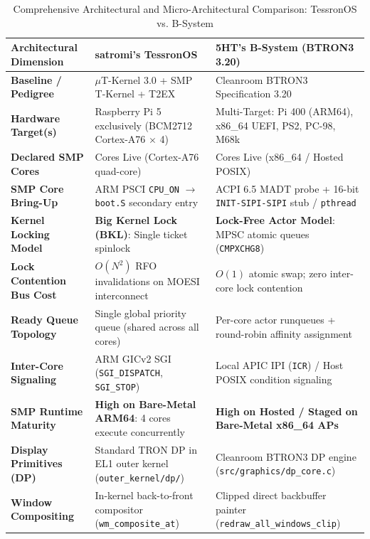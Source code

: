 \documentclass[10pt,journal,compsoc,twocolumn]{article}
\begin{document}
\begin{table}[t]
\centering
\caption{Comprehensive Architectural and Micro-Architectural Comparison: TessronOS vs. B-System}
\label{tab:comprehensive_comparison}
\scriptsize
\setlength{\tabcolsep}{5pt}
\renewcommand{\arraystretch}{1.12}
\begin{tabularx}{\textwidth}{@{} >{\raggedright\arraybackslash}p{3.8cm} >{\raggedright\arraybackslash}X >{\raggedright\arraybackslash}X @{}}
\toprule
\textbf{Architectural Dimension} & \textbf{satromi's TessronOS} & \textbf{5HT's B-System (BTRON3 3.20)} \\
\midrule
\textbf{Baseline / Pedigree} & $\mu$T-Kernel 3.0 + SMP T-Kernel + T2EX & Cleanroom BTRON3 Specification 3.20 \\
\textbf{Hardware Target(s)} & Raspberry Pi 5 exclusively (BCM2712 Cortex-A76 $\times$ 4) & Multi-Target: Pi 400 (ARM64), x86\_64 UEFI, PS2, PC-98, M68k \\
\textbf{Declared SMP Cores} & 4 Cores Live (Cortex-A76 quad-core) & 4 Cores Live (x86\_64 / Hosted POSIX) \\
\textbf{SMP Core Bring-Up} & ARM PSCI \texttt{CPU\_ON} $\to$ \texttt{boot.S} secondary entry & ACPI 6.5 MADT probe + 16-bit \texttt{INIT-SIPI-SIPI} stub / \texttt{pthread} \\
\textbf{Kernel Locking Model} & \textbf{Big Kernel Lock (BKL)}: Single ticket spinlock & \textbf{Lock-Free Actor Model}: MPSC atomic queues (\texttt{CMPXCHG8}) \\
\textbf{Lock Contention Bus Cost} & $O(N^2)$ RFO invalidations on MOESI interconnect & $O(1)$ atomic swap; zero inter-core lock contention \\
\textbf{Ready Queue Topology} & Single global priority queue (shared across all cores) & Per-core actor runqueues + round-robin affinity assignment \\
\textbf{Inter-Core Signaling} & ARM GICv2 SGI (\texttt{SGI\_DISPATCH}, \texttt{SGI\_STOP}) & Local APIC IPI (\texttt{ICR}) / Host POSIX condition signaling \\
\textbf{SMP Runtime Maturity} & \textbf{High on Bare-Metal ARM64}: 4 cores execute concurrently & \textbf{High on Hosted / Staged on Bare-Metal x86\_64 APs} \\
\midrule
\textbf{Display Primitives (DP)} & Standard TRON DP in EL1 outer kernel (\texttt{outer\_kernel/dp/}) & Cleanroom BTRON3 DP engine (\texttt{src/graphics/dp\_core.c}) \\
\textbf{Window Compositing} & In-kernel back-to-front compositor (\texttt{wm\_composite\_at}) & Clipped direct backbuffer painter (\texttt{redraw\_all\_windows\_clip}) \\

\end{tabularx}
\end{table}
\end{document}
